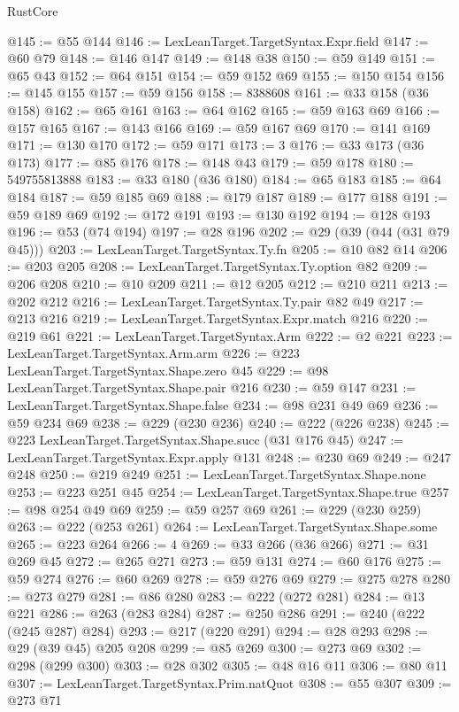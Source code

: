 \begin{lexlean}{RustCore}
\begin{coremodule}
@145 := @55 @144
@146 := LexLeanTarget.TargetSyntax.Expr.field
@147 := @60 @79
@148 := @146 @147
@149 := @148 @38
@150 := @59 @149
@151 := @65 @43
@152 := @64 @151
@154 := @59 @152 @69
@155 := @150 @154
@156 := @145 @155
@157 := @59 @156
@158 := 8388608
@161 := @33 @158 (@36 @158)
@162 := @65 @161
@163 := @64 @162
@165 := @59 @163 @69
@166 := @157 @165
@167 := @143 @166
@169 := @59 @167 @69
@170 := @141 @169
@171 := @130 @170
@172 := @59 @171
@173 := 3
@176 := @33 @173 (@36 @173)
@177 := @85 @176
@178 := @148 @43
@179 := @59 @178
@180 := 549755813888
@183 := @33 @180 (@36 @180)
@184 := @65 @183
@185 := @64 @184
@187 := @59 @185 @69
@188 := @179 @187
@189 := @177 @188
@191 := @59 @189 @69
@192 := @172 @191
@193 := @130 @192
@194 := @128 @193
@196 := @53 (@74 @194)
@197 := @28 @196
@202 := @29 (@39 (@44 (@31 @79 @45)))
@203 := LexLeanTarget.TargetSyntax.Ty.fn
@205 := @10 @82 @14
@206 := @203 @205
@208 := LexLeanTarget.TargetSyntax.Ty.option @82
@209 := @206 @208
@210 := @10 @209
@211 := @12 @205
@212 := @210 @211
@213 := @202 @212
@216 := LexLeanTarget.TargetSyntax.Ty.pair @82 @49
@217 := @213 @216
@219 := LexLeanTarget.TargetSyntax.Expr.match @216
@220 := @219 @61
@221 := LexLeanTarget.TargetSyntax.Arm
@222 := @2 @221
@223 := LexLeanTarget.TargetSyntax.Arm.arm
@226 := @223 LexLeanTarget.TargetSyntax.Shape.zero @45
@229 := @98 LexLeanTarget.TargetSyntax.Shape.pair @216
@230 := @59 @147
@231 := LexLeanTarget.TargetSyntax.Shape.false
@234 := @98 @231 @49 @69
@236 := @59 @234 @69
@238 := @229 (@230 @236)
@240 := @222 (@226 @238)
@245 := @223 LexLeanTarget.TargetSyntax.Shape.succ (@31 @176 @45)
@247 := LexLeanTarget.TargetSyntax.Expr.apply @131
@248 := @230 @69
@249 := @247 @248
@250 := @219 @249
@251 := LexLeanTarget.TargetSyntax.Shape.none
@253 := @223 @251 @45
@254 := LexLeanTarget.TargetSyntax.Shape.true
@257 := @98 @254 @49 @69
@259 := @59 @257 @69
@261 := @229 (@230 @259)
@263 := @222 (@253 @261)
@264 := LexLeanTarget.TargetSyntax.Shape.some
@265 := @223 @264
@266 := 4
@269 := @33 @266 (@36 @266)
@271 := @31 @269 @45
@272 := @265 @271
@273 := @59 @131
@274 := @60 @176
@275 := @59 @274
@276 := @60 @269
@278 := @59 @276 @69
@279 := @275 @278
@280 := @273 @279
@281 := @86 @280
@283 := @222 (@272 @281)
@284 := @13 @221
@286 := @263 (@283 @284)
@287 := @250 @286
@291 := @240 (@222 (@245 @287) @284)
@293 := @217 (@220 @291)
@294 := @28 @293
@298 := @29 (@39 @45) @205 @208
@299 := @85 @269
@300 := @273 @69
@302 := @298 (@299 @300)
@303 := @28 @302
@305 := @48 @16 @11
@306 := @80 @11
@307 := LexLeanTarget.TargetSyntax.Prim.natQuot
@308 := @55 @307
@309 := @273 @71

\end{coremodule}
\end{lexlean}
